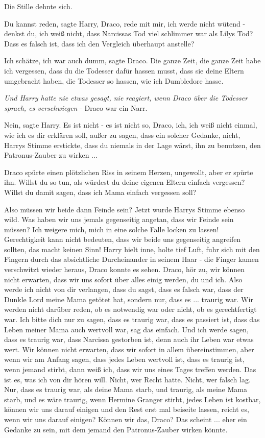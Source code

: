 Die Stille dehnte sich.

\glqq{}Du kannst reden\grqq{}, sagte Harry, \glqq{}Draco, rede mit mir, ich werde
nicht wütend - denkst du, ich weiß nicht, dass Narcissas Tod viel schlimmer war
als Lilys Tod? Dass es falsch ist, dass ich den Vergleich überhaupt
anstelle?\grqq{}

\glqq{}Ich schätze, ich war auch dumm\grqq{}, sagte Draco. \glqq{}Die ganze Zeit,
die ganze Zeit habe ich vergessen, dass du die Todesser dafür hassen musst, dass
sie deine Eltern umgebracht haben, die Todesser so hassen, wie ich Dumbledore
hasse.\grqq{}

\emph{Und Harry hatte nie etwas gesagt, nie reagiert, wenn Draco über die
Todesser sprach, es verschwiegen} - Draco war ein Narr.

\glqq{}Nein\grqq{}, sagte Harry. \glqq{}Es ist nicht - es ist nicht so, Draco,
ich, ich weiß nicht einmal, wie ich es dir erklären soll, außer zu sagen, dass
ein solcher Gedanke, nicht\grqq{}, Harrys Stimme erstickte, \glqq{}dass du
niemals in der Lage wärst, ihn zu benutzen, den Patronus-Zauber zu
wirken ...\grqq{}

Draco spürte einen plötzlichen Riss in seinem Herzen, ungewollt, aber er spürte
ihn. \glqq{}Willst du so tun, als würdest du deine eigenen Eltern einfach
vergessen? Willst du damit sagen, dass ich Mama einfach vergessen soll?\grqq{}

\glqq{}Also müssen wir beide dann Feinde sein?\grqq{} Jetzt wurde Harrys Stimme
ebenso wild. \glqq{}Was haben wir uns jemals gegenseitig angetan, dass wir Feinde
sein müssen? Ich weigere mich, mich in eine solche Falle locken zu lassen!
Gerechtigkeit kann nicht bedeuten, dass wir beide uns gegenseitig angreifen
sollten, das macht keinen Sinn!\grqq{} Harry hielt inne, holte tief Luft, fuhr
sich mit den Fingern durch das absichtliche Durcheinander in seinem Haar - die
Finger kamen verschwitzt wieder heraus, Draco konnte es sehen. \glqq{}Draco, hör
zu, wir können nicht erwarten, dass wir uns sofort über alles einig werden, du
und ich. Also werde ich nicht von dir verlangen, dass du sagst, dass es falsch
war, dass der Dunkle Lord meine Mama getötet hat, sondern nur, dass es ...
traurig war. Wir werden nicht darüber reden, ob es notwendig war oder nicht, ob
es gerechtfertigt war. Ich bitte dich nur zu sagen, dass es traurig war, dass es
passiert ist, dass das Leben meiner Mama auch wertvoll war, sag das einfach.
Und ich werde sagen, dass es traurig war, dass Narcissa gestorben ist, denn auch
ihr Leben war etwas wert. Wir können nicht erwarten, dass wir sofort in allem
übereinstimmen, aber wenn wir am Anfang sagen, dass jedes Leben wertvoll ist,
dass es traurig ist, wenn jemand stirbt, dann weiß ich, dass wir uns eines Tages
treffen werden. Das ist es, was ich von dir hören will. Nicht, wer Recht hatte.
Nicht, wer falsch lag. Nur, dass es traurig war, als deine Mama starb, und
traurig, als meine Mama starb, und es wäre traurig, wenn Hermine Granger
stirbt, jedes Leben ist kostbar, können wir uns darauf einigen und den Rest erst
mal beiseite lassen, reicht es, wenn wir uns darauf einigen? Können wir das,
Draco? Das scheint ... eher ein Gedanke zu sein, mit dem jemand den
Patronus-Zauber wirken könnte.\grqq{}

